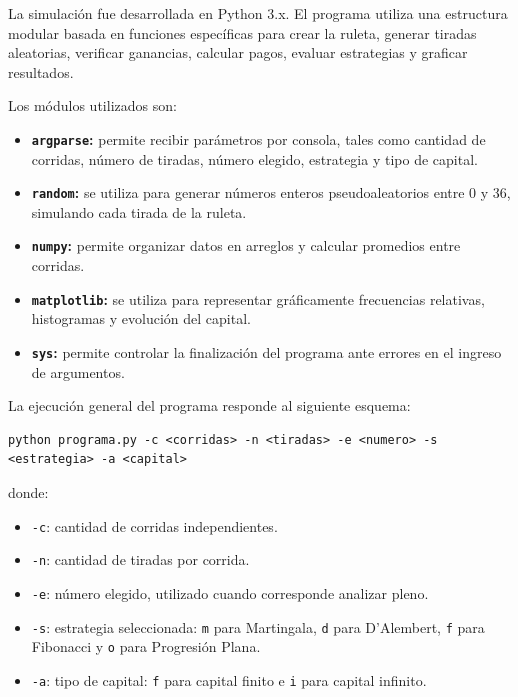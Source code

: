 \documentclass{article}
\begin{document}
La simulación fue desarrollada en Python 3.x. El programa utiliza una estructura modular basada en funciones específicas para crear la ruleta, generar tiradas aleatorias, verificar ganancias, calcular pagos, evaluar estrategias y graficar resultados.

Los módulos utilizados son:

\begin{itemize}
    \item \textbf{\texttt{argparse}:} permite recibir parámetros por consola, tales como cantidad de corridas, número de tiradas, número elegido, estrategia y tipo de capital.
    \item \textbf{\texttt{random}:} se utiliza para generar números enteros pseudoaleatorios entre 0 y 36, simulando cada tirada de la ruleta.
    \item \textbf{\texttt{numpy}:} permite organizar datos en arreglos y calcular promedios entre corridas.
    \item \textbf{\texttt{matplotlib}:} se utiliza para representar gráficamente frecuencias relativas, histogramas y evolución del capital.
    \item \textbf{\texttt{sys}:} permite controlar la finalización del programa ante errores en el ingreso de argumentos.
\end{itemize}

La ejecución general del programa responde al siguiente esquema:

\begin{verbatim}
python programa.py -c <corridas> -n <tiradas> -e <numero> -s <estrategia> -a <capital>
\end{verbatim}

donde:

\begin{itemize}
    \item \texttt{-c}: cantidad de corridas independientes.
    \item \texttt{-n}: cantidad de tiradas por corrida.
    \item \texttt{-e}: número elegido, utilizado cuando corresponde analizar pleno.
    \item \texttt{-s}: estrategia seleccionada: \texttt{m} para Martingala, \texttt{d} para D'Alembert, \texttt{f} para Fibonacci y \texttt{o} para Progresión Plana.
    \item \texttt{-a}: tipo de capital: \texttt{f} para capital finito e \texttt{i} para capital infinito.
\end{itemize}
\end{document}
